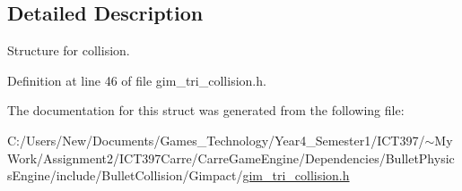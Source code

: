 \subsection{Detailed Description}
Structure for collision. 

Definition at line 46 of file gim\_\-tri\_\-collision.h.

The documentation for this struct was generated from the following file:\begin{CompactItemize}
\item 
C:/Users/New/Documents/Games\_\-Technology/Year4\_\-Semester1/ICT397/$\sim$My Work/Assignment2/ICT397Carre/CarreGameEngine/Dependencies/BulletPhysicsEngine/include/BulletCollision/Gimpact/\hyperlink{gim__tri__collision_8h}{gim\_\-tri\_\-collision.h}\end{CompactItemize}
